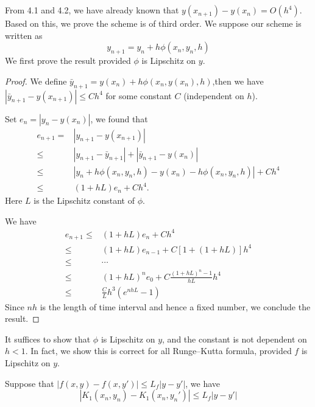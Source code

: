 \documentclass{article}
\begin{document}
\subsection{~}
From 4.1 and 4.2, we have already known that $y(x_{n+1}) - y(x_n) = O(h^4)$. Based on this, we prove the scheme is of third order. 
We suppose our scheme is written as 
$$y_{n+1} = y_n + h\phi(x_n,y_n,h)$$ We first prove the result provided $\phi$ is Lipschitz on $y$. 
\begin{proof}
	We define $\bar {y}_{n+1} = y(x_n) + h\phi(x_n, y(x_n),h)$,then we have $|\bar{y}_{n+1} - y(x_{n+1})| \le Ch^4$ for some constant $C$ (independent on $h$). 
	
	Set $e_n = |y_n - y(x_n)|$, we found that 
	\begin{equation}
	\begin{split}
	e_{n+1} =& |y_{n+1} - y(x_{n+1})|\\
	\le &|y_{n+1} - \bar y_{n+1}| + |\bar y_{n+1} - y(x_n)| \\
	\le & |y_n + h\phi(x_n,y_n,h) - y(x_n) - h\phi(x_n, y_n, h)| + Ch^{4}\\
	\le & (1+hL)e_n + Ch^4.
	\end{split}
	\end{equation}
	Here $L$ is the Lipschitz constant of $\phi$.
	
	
	We have 
		\begin{equation}
	\begin{split}
	e_{n+1} \le& (1+hL)e_n + Ch^4 \\
	\le& (1+hL)e_{n-1} + C[1 + (1+hL)]h^4\\
	\le & \cdots \\
	\le & (1+hL)^n e_0 + C\frac{(1+hL)^n-1}{hL}
h^4\\
\le & \frac{C}{L}h^3(e^{nhL}-1)	\end{split}
	\end{equation}
	Since $nh$ is the length of time interval and hence a fixed number, we conclude the result.
\end{proof}
It suffices to show that $\phi$ is Lipschitz on $y$, and the constant is not dependent on $h<1$. In fact, we show this is correct for all Runge--Kutta formula, provided $f$ is Lipschitz on $y$.

Suppose that $|f(x,y) - f(x,y')| \le L_f|y-y'|$, we have
\begin{equation}
|K_1(x_n,y_n) - K_1(x_n,y_n')| \le L_f|y-y'|
\end{equation}
\end{document}
